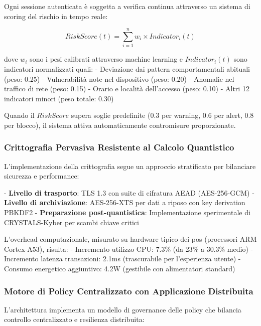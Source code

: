 Ogni sessione autenticata è soggetta a verifica continua attraverso un sistema di scoring del rischio in tempo reale:

\begin{equation}
RiskScore(t) = \sum_{i=1}^{n} w_i \times Indicator_i(t)
\end{equation}

dove $w_i$ sono i pesi calibrati attraverso machine learning e $Indicator_i(t)$ sono indicatori normalizzati quali:
- Deviazione dai pattern comportamentali abituali (peso: 0.25)
- Vulnerabilità note nel dispositivo (peso: 0.20)
- Anomalie nel traffico di rete (peso: 0.15)
- Orario e località dell'accesso (peso: 0.10)
- Altri 12 indicatori minori (peso totale: 0.30)

Quando il $RiskScore$ supera soglie predefinite (0.3 per warning, 0.6 per alert, 0.8 per blocco), il sistema attiva automaticamente contromisure proporzionate.

\subsubsection{\texorpdfstring{Crittografia Pervasiva Resistente al Calcolo Quantistico}{2.4.2.4 - Crittografia Pervasiva Resistente al Calcolo Quantistico}}

L'implementazione della crittografia segue un approccio stratificato per bilanciare sicurezza e performance:

- \textbf{Livello di trasporto}: TLS 1.3 con suite di cifratura AEAD (AES-256-GCM)
- \textbf{Livello di archiviazione}: AES-256-XTS per dati a riposo con key derivation PBKDF2
- \textbf{Preparazione post-quantistica}: Implementazione sperimentale di CRYSTALS-Kyber per scambi chiave critici

L'overhead computazionale, misurato su hardware tipico dei \gls{pos} (processori ARM Cortex-A53), risulta:
- Incremento utilizzo CPU: 7.3\% (da 23\% a 30.3\% medio)
- Incremento latenza transazioni: 2.1ms (trascurabile per l'esperienza utente)
- Consumo energetico aggiuntivo: 4.2W (gestibile con alimentatori standard)

\subsubsection{\texorpdfstring{Motore di Policy Centralizzato con Applicazione Distribuita}{2.4.2.5 - Motore di Policy Centralizzato con Applicazione Distribuita}}

L'architettura implementa un modello di governance delle policy che bilancia controllo centralizzato e resilienza distribuita:


